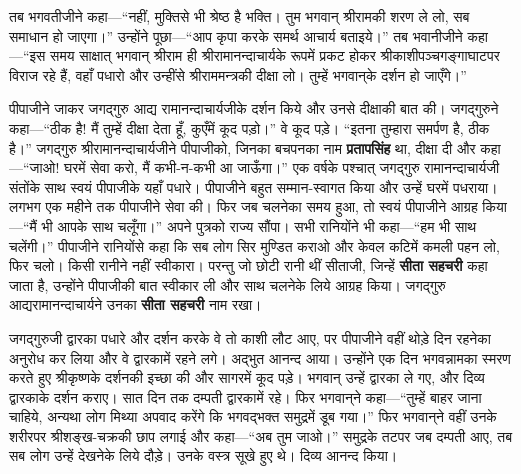 \begin{sloppypar}\justifying{}
तब भगवतीजीने कहा—“नहीं, मुक्तिसे भी श्रेष्ठ है भक्ति। तुम भगवान् श्रीरामकी शरण ले लो, सब समाधान हो जाएगा।” उन्होंने पूछा—“आप कृपा करके समर्थ आचार्य बताइये।” तब भवानीजीने कहा—“इस समय साक्षात् भगवान् श्रीराम ही श्रीरामानन्दाचार्यके रूपमें प्रकट होकर श्रीकाशी\-पञ्चगङ्गा\-घाटपर विराज रहे हैं, वहाँ पधारो और उन्हींसे श्रीराम\-मन्त्रकी दीक्षा लो। तुम्हें भगवान्‌के दर्शन हो जाएँगे।”
\end{sloppypar}
\begin{sloppypar}\justifying{}
पीपाजीने जाकर जगद्गुरु आद्य रामानन्दाचार्यजीके दर्शन किये और उनसे दीक्षाकी बात की। जगद्गुरुने कहा—“ठीक है! मैं तुम्हें दीक्षा देता हूँ, कुएँमें कूद पड़ो।” वे कूद पड़े। “इतना तुम्हारा समर्पण है, ठीक है।” जगद्गुरु श्रीरामानन्दाचार्यजीने पीपाजीको, जिनका बचपनका नाम \textbf{प्रतापसिंह} था, दीक्षा दी और कहा—“जाओ! घरमें सेवा करो, मैं कभी-न-कभी आ जाऊँगा।” एक वर्षके पश्चात् जगद्गुरु रामानन्दाचार्यजी संतोंके साथ स्वयं पीपाजीके यहाँ पधारे। पीपाजीने बहुत सम्मान-स्वागत किया और उन्हें घरमें पधराया। लगभग एक महीने तक पीपाजीने सेवा की। फिर जब चलनेका समय हुआ, तो स्वयं पीपाजीने आग्रह किया—“मैं भी आपके साथ चलूँगा।” अपने पुत्रको राज्य सौंपा। सभी रानियोंने भी कहा—“हम भी साथ चलेंगी।” पीपाजीने रानियोंसे कहा कि सब लोग सिर मुण्डित कराओ और केवल कटिमें कमली पहन लो, फिर चलो। किसी रानीने नहीं स्वीकारा। परन्तु जो छोटी रानी थीं सीताजी, जिन्हें \textbf{सीता सहचरी} कहा जाता है, उन्होंने पीपाजीकी बात स्वीकार ली और साथ चलनेके लिये आग्रह किया। जगद्गुरु आद्यरामानन्दाचार्यने उनका \textbf{सीता सहचरी} नाम रखा।
\end{sloppypar}
\begin{sloppypar}\justifying{}
जगद्गुरुजी द्वारका पधारे और दर्शन करके वे तो काशी लौट आए, पर पीपाजीने वहीं थोड़े दिन रहनेका अनुरोध कर लिया और वे द्वारकामें रहने लगे। अद्भुत आनन्द आया। उन्होंने एक दिन भगवन्नामका स्मरण करते हुए श्रीकृष्णके दर्शनकी इच्छा की और सागरमें कूद पड़े। भगवान् उन्हें द्वारका ले गए, और दिव्य द्वारकाके दर्शन कराए। सात दिन तक दम्पती द्वारकामें रहे। फिर भगवान्‌ने कहा—“तुम्हें बाहर जाना चाहिये, अन्यथा लोग मिथ्या अपवाद करेंगे कि भगवद्भक्त समुद्रमें डूब गया।” फिर भगवान्‌ने वहीं उनके शरीरपर श्रीशङ्ख-चक्रकी छाप लगाई और कहा—“अब तुम जाओ।” समुद्रके तटपर जब दम्पती आए, तब सब लोग उन्हें देखनेके लिये दौड़े। उनके वस्त्र सूखे हुए थे। दिव्य आनन्द किया।
\end{sloppypar}
